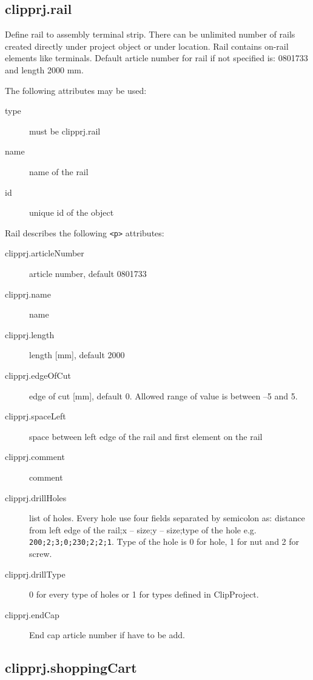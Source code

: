 \documentclass[%
	a4paper,
	oneside,
	listof=numbered,
	parskip=half,
	headsepline=true,
	footsepline=false,
	0.7headlines,
	]{scrbook}
\begin{document}
\subsection{clipprj.rail}

Define rail to assembly terminal strip.
There can be unlimited number of rails created directly under project object or under location.
Rail contains on-rail elements like terminals.
Default article number for rail if not specified is: 0801733 and length 2000 mm.

The following attributes may be used:

\begin{description}
	\item[type] must be clipprj.rail
	\item[name] name of the rail
	\item[id] unique id of the object
\end{description}

Rail describes the following \verb|<p>| attributes: 

\begin{description}
	\item[clipprj.articleNumber] article number, default 0801733 
	\item[clipprj.name] name 
	\item[clipprj.length] length [mm], default 2000 
	\item[clipprj.edgeOfCut] edge of cut [mm], default 0.
	Allowed range of value is between –5 and 5.
	\item[clipprj.spaceLeft] space between left edge of the rail and first element on the rail 
	\item[clipprj.comment] comment 
	\item[clipprj.drillHoles] list of holes.
	Every hole use four fields separated by semicolon as: distance from left edge of the rail;x – size;y – size;type of the hole e.g. \verb|200;2;3;0;230;2;2;1|.
	Type of the hole is 0 for hole, 1 for nut and 2 for screw.
	\item[clipprj.drillType] 0 for every type of holes or 1 for types defined in ClipProject. 
	\item[clipprj.endCap] End cap article number if have to be add. 
\end{description}

\subsection{clipprj.shoppingCart} 
\end{document}
